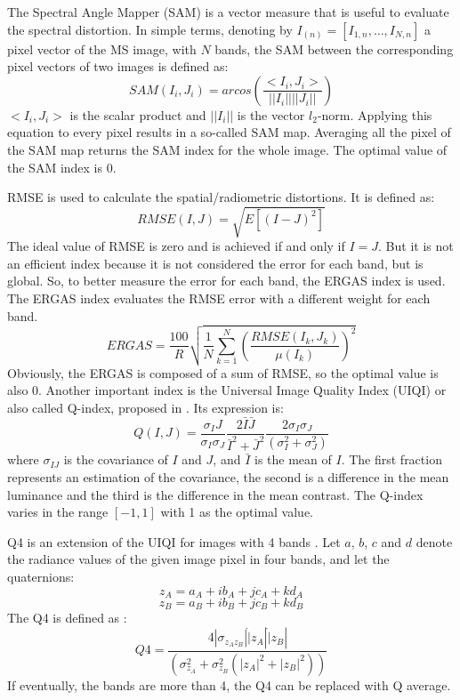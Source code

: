 \documentclass[12pt]{report}
\begin{document}
The Spectral Angle Mapper (SAM) is a vector measure that is useful to evaluate the spectral distortion.
In simple terms, denoting by $I_{(n)} = [I_{1,{n}}, \dots , I_{N,{n}}]$ a pixel vector of the MS image, with $N$ bands,
the SAM between the corresponding pixel vectors of two images is defined as:
%
\begin{equation}
    SAM(I_i, J_i) = arcos(\frac{<I_i, J_i>}{||I_i|| || J_i||})
    \label{sam}
\end{equation}
%
$<I_i, J_i>$ is the scalar product and $||I_i||$ is the vector $l_2$-norm. 
Applying this equation to every pixel results in a so-called SAM map.
Averaging all the pixel of the SAM map returns the SAM index for the whole image.
The optimal value of the SAM index is 0.

RMSE is used to calculate the spatial/radiometric distortions.
It is defined as:
%
\begin{equation}
    RMSE(I,J) = \sqrt{E[(I-J)^2]}
    \label{rmse}
\end{equation}
%
The ideal value of RMSE is zero and is achieved if and only if $I = J$.
But it is not an efficient index because it is not considered the error for each band, but is global.
So, to better measure the error for each band, the ERGAS index is used. 
The ERGAS index evaluates the RMSE error with a different weight for each band.
%
\begin{equation}
    ERGAS = \frac{100}{R} \sqrt{\frac{1}{N} \sum_{k=1}^N\left(\frac{RMSE(I_k, J_k)}{\mu(I_k)}\right)^2}
    \label{ergas}
\end{equation}
%
Obviously, the ERGAS is composed of a sum of RMSE, so the optimal value is also 0.
Another important index is the Universal Image Quality Index (UIQI) or also called Q-index, proposed in \cite{uiqi}.
Its expression is:
%
\begin{equation}
    Q(I,J) = \frac{\sigma_IJ}{\sigma_I \sigma_J} \frac{2 \bar{I}\bar{J}}{\bar{I}^2 + \bar{J}^2} 
    \frac{2 \sigma_I \sigma_J}{(\sigma_I^2 + \sigma_J^2)}
    \label{q}
\end{equation}
%
where $\sigma_{IJ}$ is the covariance of $I$ and $J$, and $\bar{I}$ is the mean of $I$.
The first fraction represents an estimation of the covariance, the second is a difference in the mean luminance
and the third is the difference in the mean contrast.
The Q-index varies in the range $[-1, 1]$ with 1 as the optimal value.


Q4 is an extension of the UIQI for images with 4 bands \cite{q4}. 
Let $a$, $b$, $c$ and $d$ denote the radiance values of the given image pixel in four bands, and let the quaternions:
%
\begin{equation}
    z_A = a_A + ib_A + jc_A + kd_A
    \label{za}
\end{equation}
%
\begin{equation}
    z_B = a_B + ib_B + jc_B + kd_B
    \label{zb}
\end{equation}
%
The Q4 is defined as :
%
\begin{equation}
    Q4 = \frac{4 | \sigma_{z_A z_B}| \dot |z_A| \dot |z_B|}{(\sigma_{z_A}^2 + \sigma_{z_B}^2 (|z_A|^2 + |z_B|^2))}
    \label{q4}
\end{equation}
%
If eventually, the bands are more than 4, the Q4 can be replaced with Q average.
\end{document}
